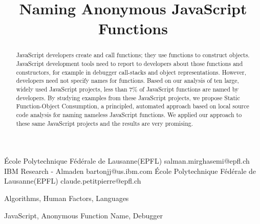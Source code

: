 \documentclass[10pt, preprint]{sigplanconf}
\begin{document}
\copyrightdata{[to be supplied]} 


\title{Naming Anonymous JavaScript Functions}

           {\'Ecole Polytechnique F\'ed\'erale de Lausanne(EPFL)}
           {salman.mirghasemi@epfl.ch}
           {IBM Research - Almaden}
           {bartonjj@us.ibm.com} 
           {\'Ecole Polytechnique F\'ed\'erale de Lausanne(EPFL)}
           {claude.petitpierre@epfl.ch}

\maketitle

\begin{abstract}
JavaScript developers create and call functions; they use functions to construct objects. JavaScript development tools need to report to developers about those functions and constructors, for example in debugger call-stacks and object representations. However, developers need not specify names for functions.  
 Based on our analysis of ten large, widely used JavaScript projects, less than 7\% of JavaScript functions are named by developers. 
By studying examples from these JavaScript projects, we propose Static Function-Object Consumption, a principled, automated approach based on local source code analysis for naming nameless JavaScript functions.  We applied our approach to these same JavaScript projects and the results are very promising.
\end{abstract}


\terms
Algorithms, Human Factors, Languages

\keywords
JavaScript, Anonymous Function Name, Debugger
\end{document}
